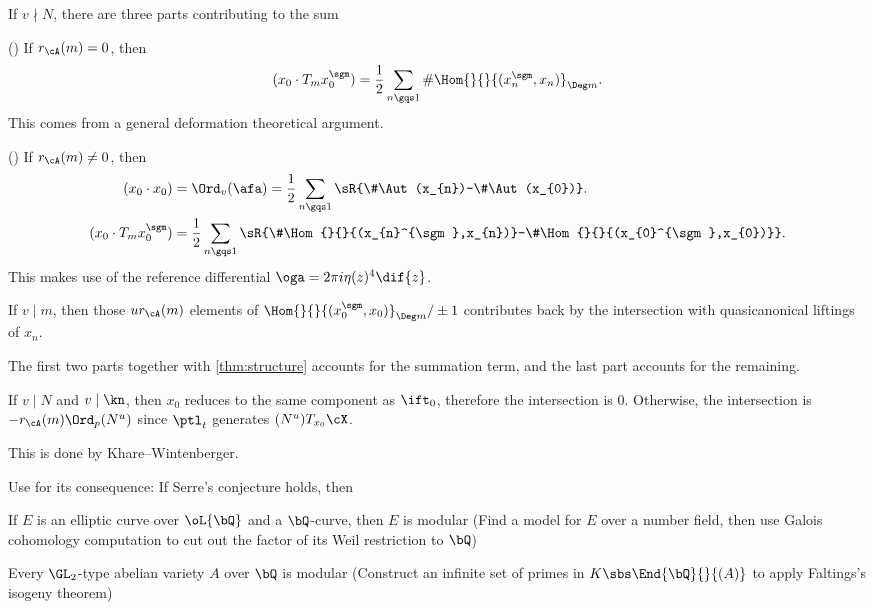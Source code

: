 \documentclass[article, a4paper, twoside]{universal}
\begin{document}
\begin{prf}
	If $v\nmid N$, there are three parts contributing to the sum
	\begin{enr}
		\item (\cite[III.4.4]{GZ1986}) If $r_{\cA}(m)=0$, then
		\[
			(x_{0}\cdot T_{m}x_{0}^{\sgm})=\frac{1}{2}\sum_{n\gqs1}\#\Hom{}{}{(x_{n}^{\sgm},x_{n})}_{\Deg m}.
		\]
		This comes from a general deformation theoretical argument.
		\item (\cite[III.8.2]{GZ1986}) If $r_{\cA}(m)\neq0$, then
		\begin{align*}
		  (x_{0}\cdot x_{0})&=\Ord_{v}(\afa)=\frac{1}{2}\sum_{n\gqs1}\sR{\#\Aut(x_{n})-\#\Aut(x_{0})}.\\
		  (x_{0}\cdot T_{m}x_{0}^{\sgm})&=\frac{1}{2}\sum_{n\gqs1}\sR{\#\Hom{}{}{(x_{n}^{\sgm},x_{n})}-\#\Hom{}{}{(x_{0}^{\sgm},x_{0})}}.
		\end{align*}
		This makes use of the reference differential $\oga=2\pi i\eta(z)^{4}\dif{z}$.
		\item If $v\mid m$, then those $ur_{\cA}(m)$ elements of $\Hom{}{}{(x_{0}^{\sgm},x_{0})}_{\Deg m}/\pm1$ contributes back by the intersection with quasicanonical liftings of $x_{n}$.
	\end{enr}
	The first two parts together with \cref{thm:structure} accounts for the summation term, and the last part accounts for the remaining.

	If $v\mid N$ and $v\mid \kn$, then $x_{0}$ reduces to the same component as $\ift_{0}$, therefore the intersection is $0$. Otherwise, the intersection is $-r_{\cA}(m)\Ord_{p}(N^{u})$ since $\ptl_{t}$ generates $(N^{u})T_{x_{0}}\cX$.
\end{prf}

This is done by Khare--Wintenberger\cite{KW2009-1,KW2009-2}.


Use \cite{Ribet1992} for its consequence: If Serre's conjecture holds, then
\begin{itm}
	\item If $E$ is an elliptic curve over $\oL{\bQ}$ and a $\bQ$-curve, then $E$ is modular (Find a model for $E$ over a number field, then use Galois cohomology computation to cut out the factor of its Weil restriction to $\bQ$)
	\item Every $\GL_{2}$-type abelian variety $A$ over $\bQ$ is modular (Construct an infinite set of primes in $K\sbs\End{\bQ}{}{(A)}$ to apply Faltings's isogeny theorem)
\end{itm}
\end{document}
